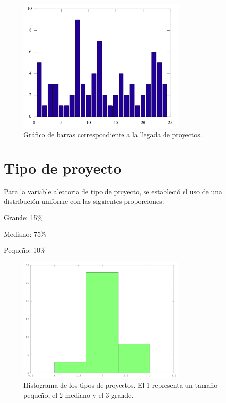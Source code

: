 \begin{figure}[H]
\begin{center}
 \includegraphics[width=0.75\textwidth,height=0.75\textheight,keepaspectratio]{./images/projects-arrivals.png}
\end{center}
\caption{Gráfico de barras correspondiente a la llegada de proyectos.}
\end{figure}

\section*{Tipo de proyecto}

Para la variable aleatoria de tipo de proyecto, se estableció el uso de una distribución uniforme con las siguientes proporciones: 

\begin{itemize*}
    \item Grande: 15\%
    \item Mediano: 75\%
    \item Pequeño: 10\%
\end{itemize*}

\begin{figure}[H]
\begin{center}
 \includegraphics[width=0.75\textwidth,height=0.75\textheight,keepaspectratio]{./images/proyect-types.png}
\end{center}
\caption{Histograma de los tipos de proyectos. El 1 representa un tamaño pequeño, el 2 mediano y el 3 grande.}
\end{figure}

